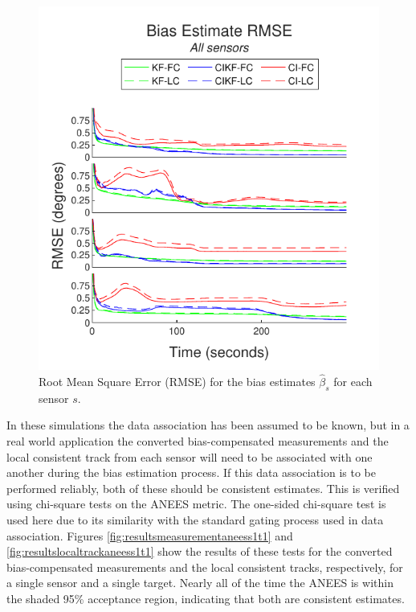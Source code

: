 \documentclass[journal]{IEEEtran}
\begin{document}
\begin{figure}[ht]
    \centering
    \includegraphics[scale=0.85]{bias_rmse.pdf}
    \caption{Root Mean Square Error (RMSE) for the bias estimates $\hat{\beta}_{s}$ for each sensor $s$.}
    \label{fig:resultsbiasrmse}
\end{figure}

In these simulations the data association has been assumed to be known, but in a real world application the converted bias-compensated measurements and the local consistent track from each sensor will need to be associated with one another during the bias estimation process. If this data association is to be performed reliably, both of these should be consistent estimates. This is verified using chi-square tests on the ANEES metric. The one-sided chi-square test is used here due to its similarity with the standard gating process used in data association. Figures \ref{fig:resultsmeasurementaneess1t1} and \ref{fig:resultslocaltrackaneess1t1} show the results of these tests for the converted bias-compensated measurements and the local consistent tracks, respectively, for a single sensor and a single target. Nearly all of the time the ANEES is within the shaded 95\% acceptance region, indicating that both are consistent estimates.
\end{document}
